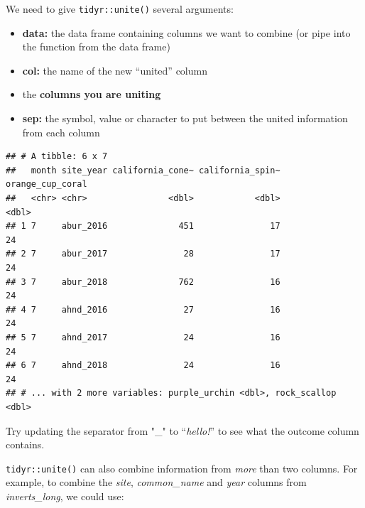 \documentclass[]{book}
\newenvironment{Shaded}{\begin{snugshade}}{\end{snugshade}}
\newcommand{\CommentTok}[1]{\textcolor[rgb]{0.56,0.35,0.01}{\textit{#1}}}
\newcommand{\DataTypeTok}[1]{\textcolor[rgb]{0.13,0.29,0.53}{#1}}
\newcommand{\KeywordTok}[1]{\textcolor[rgb]{0.13,0.29,0.53}{\textbf{#1}}}
\newcommand{\NormalTok}[1]{#1}
\newcommand{\OperatorTok}[1]{\textcolor[rgb]{0.81,0.36,0.00}{\textbf{#1}}}
\newcommand{\StringTok}[1]{\textcolor[rgb]{0.31,0.60,0.02}{#1}}
\providecommand{\tightlist}{%
  \setlength{\itemsep}{0pt}\setlength{\parskip}{0pt}}
\begin{document}
We need to give \texttt{tidyr::unite()} several arguments:

\begin{itemize}
\tightlist
\item
  \textbf{data:} the data frame containing columns we want to combine (or pipe into the function from the data frame)
\item
  \textbf{col:} the name of the new ``united'' column
\item
  the \textbf{columns you are uniting}
\item
  \textbf{sep:} the symbol, value or character to put between the united information from each column
\end{itemize}

\begin{Shaded}
\end{Shaded}

\begin{verbatim}
## # A tibble: 6 x 7
##   month site_year california_cone~ california_spin~ orange_cup_coral
##   <chr> <chr>                <dbl>            <dbl>            <dbl>
## 1 7     abur_2016              451               17               24
## 2 7     abur_2017               28               17               24
## 3 7     abur_2018              762               16               24
## 4 7     ahnd_2016               27               16               24
## 5 7     ahnd_2017               24               16               24
## 6 7     ahnd_2018               24               16               24
## # ... with 2 more variables: purple_urchin <dbl>, rock_scallop <dbl>
\end{verbatim}

Try updating the separator from "\_" to ``\emph{hello!}'' to see what the outcome column contains.

\texttt{tidyr::unite()} can also combine information from \emph{more} than two columns. For example, to combine the \emph{site}, \emph{common\_name} and \emph{year} columns from \emph{inverts\_long}, we could use:
\end{document}

